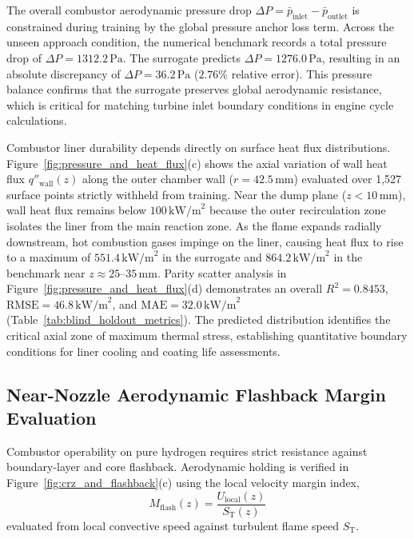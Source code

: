 \documentclass[reprint,aps,prfluids,superscriptaddress,twocolumn,floatfix]{revtex4-2}
\begin{document}
The overall combustor aerodynamic pressure drop $\Delta P = \bar{p}_{\text{inlet}} - \bar{p}_{\text{outlet}}$ is constrained during training by the global pressure anchor loss term. Across the unseen approach condition, the numerical benchmark records a total pressure drop of $\Delta P = 1312.2\,\text{Pa}$. The surrogate predicts $\Delta P = 1276.0\,\text{Pa}$, resulting in an absolute discrepancy of $\Delta P = 36.2\,\text{Pa}$ ($2.76\%$ relative error). This pressure balance confirms that the surrogate preserves global aerodynamic resistance, which is critical for matching turbine inlet boundary conditions in engine cycle calculations.

Combustor liner durability depends directly on surface heat flux distributions. Figure~\ref{fig:pressure_and_heat_flux}(c) shows the axial variation of wall heat flux $q''_{\text{wall}}(z)$ along the outer chamber wall ($r = 42.5\,\text{mm}$) evaluated over 1,527 surface points strictly withheld from training. Near the dump plane ($z < 10\,\text{mm}$), wall heat flux remains below $100\,\text{kW/m}^2$ because the outer recirculation zone isolates the liner from the main reaction zone. As the flame expands radially downstream, hot combustion gases impinge on the liner, causing heat flux to rise to a maximum of $551.4\,\text{kW/m}^2$ in the surrogate and $864.2\,\text{kW/m}^2$ in the benchmark near $z \approx 25\text{--}35\,\text{mm}$. Parity scatter analysis in Figure~\ref{fig:pressure_and_heat_flux}(d) demonstrates an overall $R^2 = 0.8453$, $\text{RMSE} = 46.8\,\text{kW/m}^2$, and $\text{MAE} = 32.0\,\text{kW/m}^2$ (Table~\ref{tab:blind_holdout_metrics}). The predicted distribution identifies the critical axial zone of maximum thermal stress, establishing quantitative boundary conditions for liner cooling and coating life assessments.

\subsection{Near-Nozzle Aerodynamic Flashback Margin Evaluation}

Combustor operability on pure hydrogen requires strict resistance against boundary-layer and core flashback. Aerodynamic holding is verified in Figure~\ref{fig:crz_and_flashback}(c) using the local velocity margin index,
\begin{equation}
    M_{\text{flash}}(z) = \frac{U_{\text{local}}(z)}{S_{\text{T}}(z)}
    \label{eq:flashback_margin}
\end{equation}
evaluated from local convective speed against turbulent flame speed $S_{\text{T}}$.
\end{document}
